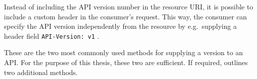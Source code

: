 Instead of including the \ac{API} version number in the resource \ac{URI}, it
is possible to include a custom header in the consumer's request. This way, the
consumer can specify the \ac{API} version independently from the resource by
e.g.\ supplying a header field \texttt{API-Version: v1}
\autocite{MicrosoftAPIdesign2018}.

These are the two most commonly used methods for supplying a version to an
\ac{API}. For the purpose of this thesis, these two are sufficient. If
required, \autocite{MicrosoftAPIdesign2018} outlines two additional methods.
